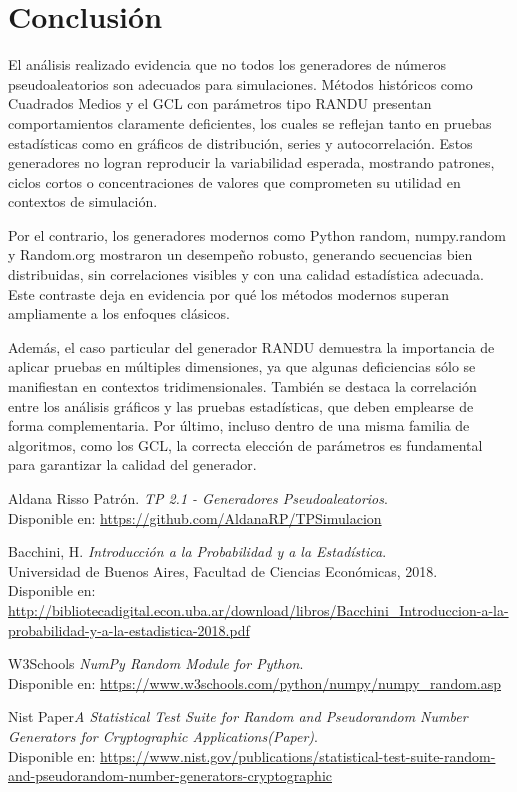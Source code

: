 \documentclass{article}
\begin{document}
\section{Conclusión}
El análisis realizado evidencia que no todos los generadores de números pseudoaleatorios son adecuados para simulaciones. Métodos históricos como Cuadrados Medios y el GCL con parámetros tipo RANDU presentan comportamientos claramente deficientes, los cuales se reflejan tanto en pruebas estadísticas como en gráficos de distribución, series y autocorrelación. Estos generadores no logran reproducir la variabilidad esperada, mostrando patrones, ciclos cortos o concentraciones de valores que comprometen su utilidad en contextos de simulación.

Por el contrario, los generadores modernos como Python random, numpy.random y Random.org mostraron un desempeño robusto, generando secuencias bien distribuidas, sin correlaciones visibles y con una calidad estadística adecuada. Este contraste deja en evidencia por qué los métodos modernos superan ampliamente a los enfoques clásicos.

Además, el caso particular del generador RANDU demuestra la importancia de aplicar pruebas en múltiples dimensiones, ya que algunas deficiencias sólo se manifiestan en contextos tridimensionales. También se destaca la correlación entre los análisis gráficos y las pruebas estadísticas, que deben emplearse de forma complementaria. Por último, incluso dentro de una misma familia de algoritmos, como los GCL, la correcta elección de parámetros es fundamental para garantizar la calidad del generador.

  
\begin{thebibliography}{99}

Aldana Risso Patrón. \textit{TP 2.1 - Generadores Pseudoaleatorios}.\\
Disponible en: \url{https://github.com/AldanaRP/TPSimulacion}


Bacchini, H. \textit{Introducción a la Probabilidad y a la Estadística}.\\
Universidad de Buenos Aires, Facultad de Ciencias Económicas, 2018.\\
Disponible en: \url{http://bibliotecadigital.econ.uba.ar/download/libros/Bacchini_Introduccion-a-la-probabilidad-y-a-la-estadistica-2018.pdf}

W3Schools \textit{NumPy Random Module for Python}.\\
Disponible en: \url{https://www.w3schools.com/python/numpy/numpy_random.asp}

 Nist Paper\textit{A Statistical Test Suite for Random and Pseudorandom Number Generators for Cryptographic Applications(Paper)}.\\
Disponible en: \url{https://www.nist.gov/publications/statistical-test-suite-random-and-pseudorandom-number-generators-cryptographic}

\end{thebibliography}
\end{document}
